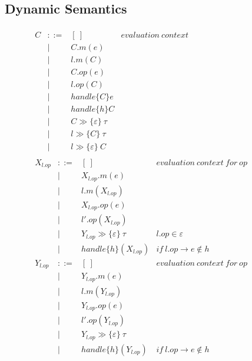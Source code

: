 \documentclass{article}
\begin{document}
\subsection{Dynamic Semantics}
\label{sec-dynamic}
\begin{figure}[H]
\flushleft



\footnotesize{

\[
\begin{array}{lll}
\begin{array}{lllr}
C & ::= & [~] & \mathit{evaluation~context}\\
  & |   & C.m(e)\\
	  & |   & l.m(C)\\
	  & |   & C.op(e)\\
	  & |   &  l.op(C)\\
  & |   & handle\{C\}e \\

  & |   & handle\{h\}C \\
  & |   & C \gg \{\varepsilon\}\ \tau  \\

  & |   & l \gg \{C\}\ \tau  \\
  & |   & l \gg \{\varepsilon\}\ C  \\
  

\end{array}
\begin{array}{lllr}

X_{l.op} & ::= &[~] & \mathit{evaluation~context~for~op}\\
  & |  &  X_{l.op}.m(e)\\
  & | &  l.m(X_{l.op})\\
    & |  &  X_{l.op}.op(e)\\
  & | &  l'.op(X_{l.op})\\
  & | & Y_{l.op} \gg \{ \varepsilon \}\ \tau & \mathit{l.op \in \varepsilon}\\
  & | & handle\{h\} (X_{l.op}) &\mathit{if~l.op \rightarrow e \not\in h}\\
Y_{l.op} & ::= &[~] & \mathit{evaluation~context~for~op}\\
  & |  &  Y_{l.op}.m(e)\\
  & | &  l.m(Y_{l.op})\\
    & |  &  Y_{l.op}.op(e)\\
  & | &  l'.op(Y_{l.op})\\
  & | & Y_{l.op} \gg \{ \varepsilon \}\ \tau\\
  & | & handle\{h\} (Y_{l.op}) &\mathit{if~l.op \rightarrow e \not\in h}\\


\end{array}
\end{array}\]}
\end{figure}
\end{document}
